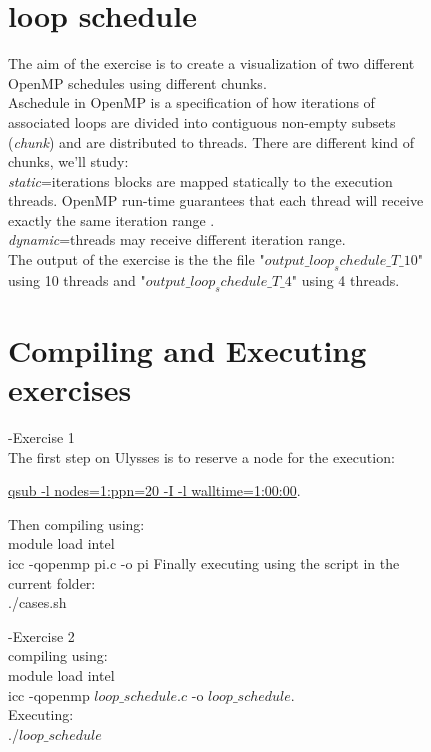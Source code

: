 \documentclass[12pt,a4paper,titlepage,twoside]{book}
\begin{document}
\newpage
\begin{figure}
	\section*{loop schedule}
	The aim of the exercise is to create a visualization of two different OpenMP schedules using different chunks.\\
	Aschedule in OpenMP is a specification of how iterations of associated loops are divided into contiguous non-empty subsets (\textit{chunk}) and are distributed to threads. There are different kind of chunks, we'll study:\\
	 \textit{static}=iterations blocks are mapped statically to the execution threads.  OpenMP run-time guarantees that each thread will receive exactly the same iteration range .\\ 
	  \textit{dynamic}=threads may receive different iteration range.
	 \\
	 The output of the exercise is the the file "\textit{$output\_loop_schedule\_T\_10$}" using 10 threads and "\textit{$output\_loop_schedule\_T\_4$}" using 4 threads.
	\section*{Compiling and Executing exercises} 
	-Exercise 1\\
	The first step on Ulysses is to reserve a node for the execution:
	
	\underline{qsub -l nodes=1:ppn=20 -I -l walltime=1:00:00}.\vspace{0.5cm}

	Then compiling using:\\
	module load intel\\
	icc -qopenmp pi.c -o pi\vspace{0.5cm}
	Finally executing using the script in the current folder:\\
	./cases.sh\vspace{0.5cm}
	
	-Exercise 2\\
	compiling using:\\
	module load intel\\
    icc -qopenmp $loop\_schedule.c $ -o $loop\_schedule$.\vspace{0.5cm}
    \\Executing:\\
	./$loop\_schedule$
	
\end{figure}
\end{document}
